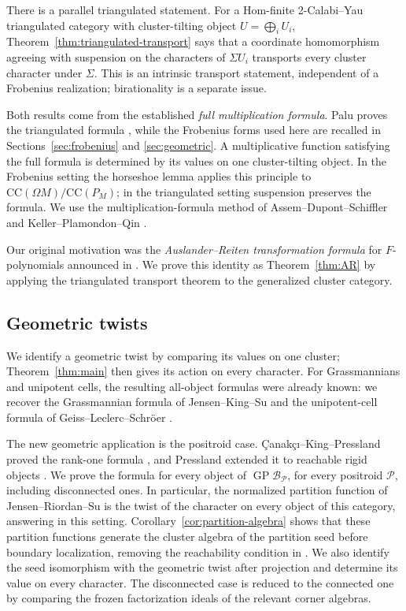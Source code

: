\documentclass[11pt]{amsart}
\numberwithin{equation}{section}
\theoremstyle{definition}
\theoremstyle{remark}
\newcommand{\op}[1]{\operatorname{#1}}
\newcommand{\Pcal}{\mathcal P}
\newcommand{\CC}{\mathrm{CC}}
\newcommand{\GP}{\op{GP}}
\begin{document}
There is a parallel triangulated statement. For a Hom-finite
2-Calabi--Yau triangulated category with cluster-tilting object
$U=\bigoplus_iU_i$, Theorem~\ref{thm:triangulated-transport} says that a
coordinate homomorphism agreeing with suspension on the characters of
$\Sigma U_i$ transports every cluster character under $\Sigma$. This is
an intrinsic transport statement, independent of a Frobenius realization;
birationality is a separate issue.

Both results come from the established \emph{full multiplication formula}.
Palu proves the triangulated formula \cite[Theorem~1.1]{Pal12}, while the
Frobenius forms used here are recalled in
Sections~\ref{sec:frobenius} and \ref{sec:geometric}. A multiplicative
function satisfying the full formula is determined by its values on one
cluster-tilting object. In the Frobenius setting the horseshoe lemma
applies this principle to $\CC(\Omega M)/\CC(P_M)$; in the triangulated
setting suspension preserves the formula. We use the multiplication-formula
method of Assem--Dupont--Schiffler \cite[Theorem~6.13]{ADS14} and
Keller--Plamondon--Qin \cite[Theorem~4.1 and Remark~4.2]{KPQ}.

Our original motivation was the \emph{Auslander--Reiten transformation
formula} for $F$-polynomials announced in \cite[Theorem~1.9]{Fei}.
We prove this identity as Theorem~\ref{thm:AR} by applying the
triangulated transport theorem to the generalized cluster category.
\subsection*{Geometric twists}
We identify a geometric twist by comparing its values on one cluster;
Theorem~\ref{thm:main} then gives its action on every character. For
Grassmannians and unipotent cells, the resulting all-object formulas were
already known: we recover the Grassmannian formula of Jensen--King--Su
\cite[Proposition~9.14]{JKS24} and the unipotent-cell formula of
Geiss--Leclerc--Schr\"oer \cite[Theorem~6]{GLS12}.

The new geometric application is the positroid case. \c{C}anak\c{c}\i--King--Pressland
proved the rank-one formula \cite[Theorem~12.2]{CKP24}, and Pressland
extended it to reachable rigid objects \cite[Theorem~5.27]{Pre}. We prove
the formula for every object of $\GP\mathcal B_\Pcal$, for every positroid
$\Pcal$, including disconnected ones. In particular, the normalized
partition function of Jensen--Riordan--Su is the twist of the character on
every object of this category, answering \cite[Remark~7.7]{JRS26} in this
setting. Corollary~\ref{cor:partition-algebra} shows that these partition
functions generate the cluster algebra of the partition seed before
boundary localization, removing the reachability condition in
\cite[Remark~7.13]{JRS26}. We also identify the seed isomorphism with the
geometric twist after projection and determine its value on every character.
The disconnected case is reduced to the connected one by comparing the
frozen factorization ideals of the relevant corner algebras.
\end{document}
